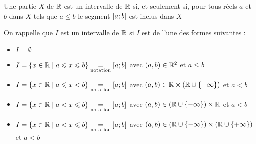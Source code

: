 \begin{defprop}
    Une partie \(X\) de \(\mathbb{R}\) est un intervalle de \(\mathbb{R}\) si, et seulement si, pour tous réels \(a\) et \(b\) dans \(X\) tels que \(a\leq b\) le segment \(\left[a;b\right]\) est inclus dans \(X\)
\end{defprop}

\begin{dem}
    On rappelle que \(I\) est un intervalle de \(\mathbb{R}\) si \(I\) est de l'une des formes suivantes : 
    \begin{itemize}
		\item \(I = \emptyset\) \\
		\item \(I = \left\lbrace x \in \mathbb{R}\;\middle|\; a \leqslant x \leqslant b\right\rbrace \underset{\mathrm{notation}}{=} \left[a;b\right]\) avec \(\left(a,b\right) \in \mathbb{R}^2 \) et \(a\leq b \) \\
		\item \(I = \left\lbrace x \in \mathbb{R}\;\middle|\; a \leqslant x < b\right\rbrace \underset{\mathrm{notation}}{=} \left[a;b\right[\) avec \(\left(a,b\right) \in \mathbb{R}\times \left(\mathbb{R} \cup \left\lbrace+\infty\right\rbrace\right) \) et \(a < b\) \\
		\item \(I = \left\lbrace x \in \mathbb{R}\;\middle|\; a < x \leqslant b\right\rbrace \underset{\mathrm{notation}}{=} \left]a;b\right]\) avec \(\left(a,b\right) \in \left(\mathbb{R} \cup \left\lbrace-\infty\right\rbrace\right)\times \mathbb{R} \) et \(a < b\) \\
		\item \(I = \left\lbrace x \in \mathbb{R}\;\middle|\; a < x \leqslant b\right\rbrace \underset{\mathrm{notation}}{=} \left]a;b\right[\) avec \(\left(a,b\right) \in \left(\mathbb{R} \cup \left\lbrace-\infty\right\rbrace\right)\times  \left(\mathbb{R} \cup \left\lbrace+\infty\right\rbrace\right) \) et \(a < b\) \\
	\end{itemize}


\end{dem}
